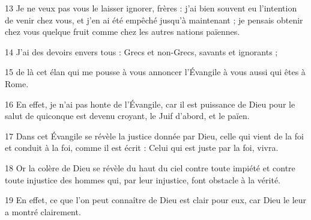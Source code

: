 
13 Je ne veux pas vous le laisser ignorer, frères : j’ai bien souvent eu l’intention de venir chez vous, et j’en ai été empêché jusqu’à maintenant ; je pensais obtenir chez vous quelque fruit comme chez les autres nations païennes.

14 J’ai des devoirs envers tous : Grecs et non-Grecs, savants et ignorants ;

15 de là cet élan qui me pousse à vous annoncer l’Évangile à vous aussi qui êtes à Rome.

16 En effet, je n’ai pas honte de l’Évangile, car il est puissance de Dieu pour le salut de quiconque est devenu croyant, le Juif d’abord, et le païen.

17 Dans cet Évangile se révèle la justice donnée par Dieu, celle qui vient de la foi et conduit à la foi, comme il est écrit : Celui qui est juste par la foi, vivra.

18 Or la colère de Dieu se révèle du haut du ciel contre toute impiété et contre toute injustice des hommes qui, par leur injustice, font obstacle à la vérité.

19 En effet, ce que l’on peut connaître de Dieu est clair pour eux, car Dieu le leur a montré clairement.